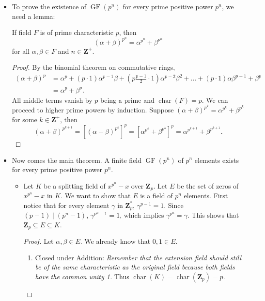 \documentclass[11pt]{article}
\newcommand{\Z}{\mathbf{Z}}
\newcommand{\kar}{\operatorname{char}}
\newcommand{\GF}{\operatorname{GF}} %
\begin{document}
\begin{itemize}
\begin{proof}
        Since $x^{p^n}-x = x (x^{p^n-1} - 1)$, every nonzero root to $x^{p^n}-x$ is a root to $x^{p^n-1} - 1$. Say $\alpha \in K^*$ is a root to $x^{p^n-1} - 1$. Then by long division \[\frac{x^{p^n-1} - 1}{x-\alpha} = x^{p^n - 2}+\alpha x^{p^n - 3} + \alpha^2 x^{p^n - 4}+ \dots + \alpha^{p^n - 3}x + \alpha^{p^n - 2}.\] Call this polynomial $g(x)$, then \[g(\alpha) = (p^n-1)\alpha^{p^n - 2} = (p^n-1)\frac{1}{\alpha} = -\frac{1}{\alpha} \neq 0\] (by $\alpha^{p^n-1} - 1 = 0$ and $\kar(F)=p$). This shows that every zero $\alpha$ has multiplicity 1.
    \end{proof}
    \item To prove the existence of $\GF(p^n)$ for every prime positive power $p^n$, we need a lemma:
    
    If field $F$ is of prime characteristic $p$, then \[(\alpha + \beta)^{p^n} = \alpha^{p^n} + \beta^{p^n}\] for all $\alpha,\beta \in F$ and $n \in \Z^+$.
    \begin{proof}
        By the binomial theorem on commutative rings,
        \begin{align*}
            (\alpha + \beta)^p & = \alpha^p + (p \cdot 1) \alpha^{p-1}\beta + (p\frac{p-1}{2} \cdot 1)\alpha^{p-2}\beta^2 + \dots + (p \cdot 1) \alpha\beta^{p-1} + \beta^p \\ & = \alpha^p + \beta^p.
        \end{align*}
        All middle terms vanish by $p$ being a prime and $\kar(F) = p$. We can proceed to higher prime powers by induction. Suppose $(\alpha + \beta)^{p^k} = \alpha^{p^k} + \beta^{p^k}$ for some $k \in \Z^+$, then \[(\alpha + \beta)^{p^{k+1}} = \left[(\alpha + \beta)^{p^k}\right]^p = \left[\alpha^{p^k} + \beta^{p^k}\right]^p = \alpha^{p^{k+1}} + \beta^{p^{k+1}}.\]
    \end{proof}
    \item Now comes the main theorem. A finite field $\GF(p^n)$ of $p^n$ elements exists for every prime positive power $p^n$. 
    \begin{itemize}
        \item Let $K$ be a splitting field of $x^{p^n} - x$ over $\Z_p$. Let $E$ be the set of zeros of $x^{p^n} - x$ in $K$. We want to show that $E$ is a field of $p^n$ elements. First notice that for every element $\gamma$ in $\Z_p^*$, $\gamma^{p-1} = 1$. Since $(p-1) \mid (p^n - 1)$, $\gamma^{p^n-1} = 1$, which implies $\gamma^{p^n} = \gamma$. This shows that $\Z_p \subseteq E \subseteq K$.
        \begin{proof}
            Let $\alpha,\beta \in E$. We already know that $0,1 \in E$.
        \begin{enumerate}[label=(\roman*)]
            \item Closed under Addition: \emph{Remember that the extension field should still be of the same characteristic as the original field because both fields have the common unity 1.} Thus $\kar(K) = \kar(\Z_p) = p$.
            

\end{enumerate}
\end{proof}
\end{itemize}
\end{itemize}
\end{document}
